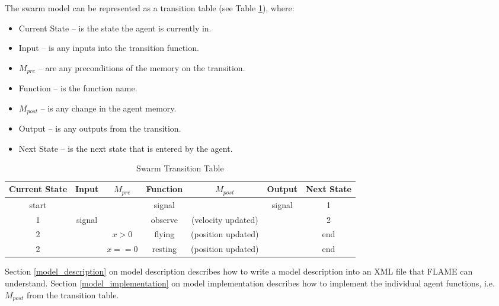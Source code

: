 The swarm model can be represented as a transition table (see Table
\ref{tab:swarmtransition}), where:

\begin{itemize}
  \item Current State -- is the state the agent is currently in.
  \item Input -- is any inputs into the transition function.
  \item $M_{pre}$ -- are any preconditions of the memory on the transition.
  \item Function -- is the function name.
  \item $M_{post}$ -- is any change in the agent memory.
  \item Output -- is any outputs from the transition.
  \item Next State -- is the next state that is entered by the agent.
\end{itemize}

\begin{table}[ht]
\centering
\begin{tabular}{|c|c|c||c||c|c|c|}
\hline
Current State&Input&$M_{pre}$&Function&$M_{post}$&Output&Next State\\
\hline
\hline
start&&&signal&&signal&1\\
\hline
1&signal&&observe&(velocity updated)&&2\\
\hline
2&&$x > 0$&flying&(position updated)&&end\\
\hline
2&&$x == 0$&resting&(position updated)&&end\\
\hline
\end{tabular}
\caption{Swarm Transition Table}
\label{tab:swarmtransition}
\end{table}

Section \ref{model_description} on model description describes how to write a
model description into an XML file that FLAME can understand. Section
\ref{model_implementation} on model implementation describes how to implement
the individual agent functions, i.e. $M_{post}$ from the transition table. 


